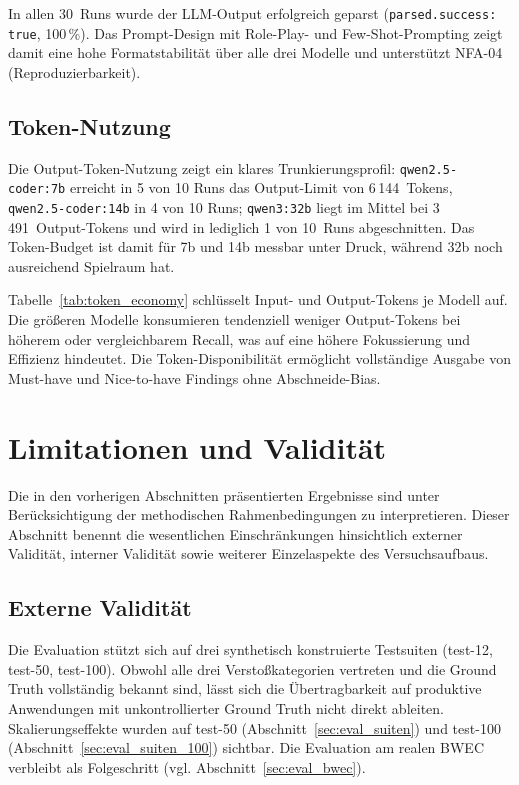 In allen 30~Runs wurde der \ac{LLM}-Output erfolgreich geparst (\texttt{parsed.success: true}, 100\,\%). Das Prompt-Design mit Role-Play- und Few-Shot-Prompting zeigt damit eine hohe Formatstabilität über alle drei Modelle und unterstützt \ac{NFA}-04 (Reproduzierbarkeit).

\subsection{Token-Nutzung}
\label{sec:effizienz_tokens}

Die Output-Token-Nutzung zeigt ein klares Trunkierungsprofil: \texttt{qwen2.5-coder:7b} erreicht in 5 von 10 Runs das Output-Limit von 6\,144~Tokens, \texttt{qwen2.5-coder:14b} in 4 von 10 Runs; \texttt{qwen3:32b} liegt im Mittel bei 3\,491~Output-Tokens und wird in lediglich 1 von 10~Runs abgeschnitten. Das Token-Budget ist damit für 7b und 14b messbar unter Druck, während 32b noch ausreichend Spielraum hat.

Tabelle~\ref{tab:token_economy} schlüsselt Input- und Output-Tokens je Modell auf. Die größeren Modelle konsumieren tendenziell weniger Output-Tokens bei höherem oder vergleichbarem Recall, was auf eine höhere Fokussierung und Effizienz hindeutet. Die Token-Disponibilität ermöglicht vollständige Ausgabe von Must-have und Nice-to-have Findings ohne Abschneide-Bias.

\section{Limitationen und Validität}
\label{sec:limitationen}

Die in den vorherigen Abschnitten präsentierten Ergebnisse sind unter Berücksichtigung der methodischen Rahmenbedingungen zu interpretieren. Dieser Abschnitt benennt die wesentlichen Einschränkungen hinsichtlich externer Validität, interner Validität sowie weiterer Einzelaspekte des Versuchsaufbaus.

\subsection{Externe Validität}
\label{sec:limit_extern}

Die Evaluation stützt sich auf drei synthetisch konstruierte Testsuiten (test-12, test-50, test-100). Obwohl alle drei Verstoßkategorien vertreten und die Ground Truth vollständig bekannt sind, lässt sich die Übertragbarkeit auf produktive Anwendungen mit unkontrollierter Ground Truth nicht direkt ableiten. Skalierungseffekte wurden auf test-50 (Abschnitt~\ref{sec:eval_suiten}) und test-100 (Abschnitt~\ref{sec:eval_suiten_100}) sichtbar. Die Evaluation am realen \ac{BWEC} verbleibt als Folgeschritt (vgl. Abschnitt~\ref{sec:eval_bwec}).

